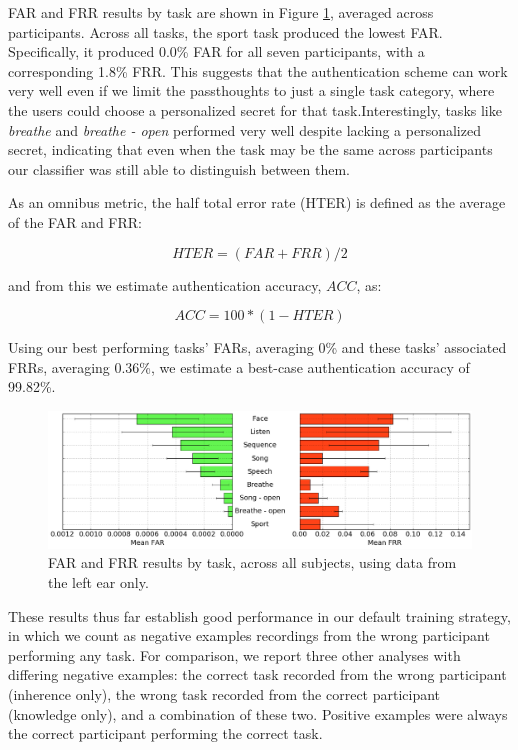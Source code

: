 \documentclass{sigchi}
\begin{document}
FAR and FRR results by task are shown in Figure \ref{fig:meanByTask}, averaged across participants. Across all tasks, the sport task produced the lowest FAR. Specifically, it produced 0.0\% FAR for all seven participants, with a corresponding 1.8\% FRR. This suggests that the authentication scheme can work very well even if we limit the passthoughts to just a single task category, where the users could choose a personalized secret for that task.Interestingly, tasks like \textit{breathe} and \textit{breathe - open} performed very well despite lacking a personalized secret, indicating that even when the task may be the same across participants our classifier was still able to distinguish between them.

As an omnibus metric, the half total error rate (HTER) is defined as the average of the FAR and FRR: 

\[ HTER = (FAR + FRR) / 2 \]

and from this we estimate authentication accuracy, $ACC$, as:

\[ ACC = 100*(1-HTER) \]

Using our best performing tasks' FARs, averaging 0\% and these tasks' associated FRRs, averaging 0.36\%, we estimate a best-case authentication accuracy of 99.82\%.

\begin{figure}[t]
\centering
\includegraphics[width=.9\linewidth]{./figures/mean-far-and-frr-by-task.png}
\caption{FAR and FRR results by task, across all subjects, using data from the left ear only.}
\label{fig:meanByTask}
\end{figure}

These results thus far establish good performance in our default training strategy, in which we count as negative examples recordings from the wrong participant performing any task. For comparison, we report three other analyses with differing negative examples: the correct task recorded from the wrong participant (inherence only), the wrong task recorded from the correct participant (knowledge only), and a combination of these two. Positive examples were always the correct participant performing the correct task.
\end{document}
